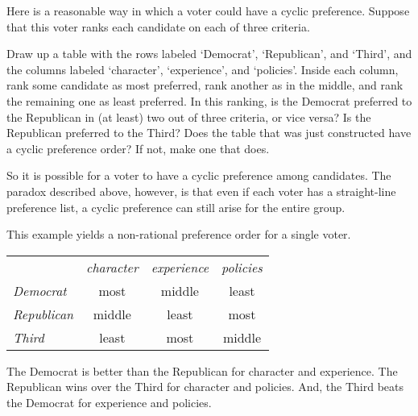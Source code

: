 \begin{exercises}
  \item \label{IrrIndVote}
    Here is a reasonable way in which a voter could have a cyclic preference.
    Suppose that this voter ranks each candidate
    on each of three criteria.
    \begin{exparts}
      \partsitem Draw up a table with the rows labeled `Democrat',
         `Republican', and `Third', and the columns labeled
         `character', `experience', and `policies'.
         Inside each column, rank some 
         candidate as most preferred, 
         rank another as in the middle, and rank the remaining one
         as least preferred.
      \partsitem In this ranking, is the Democrat preferred to the Republican
         in (at least) two out of three criteria, or vice versa?
         Is the Republican preferred to the Third?
      \partsitem  Does the table that was 
         just constructed have a cyclic preference order?
         If not, make one that does.
    \end{exparts}
    So it is possible for a voter to have a cyclic preference among candidates.
    The paradox described above, however, is that even if each voter has a
    straight-line preference list, 
    a cyclic preference can still arise for the entire group. 
    \begin{answer}
      This example yields a non-rational preference order for a 
      single voter.
      \smallskip
      \begin{center}
        \begin{tabular}{l|c|c|c|}
             \multicolumn{1}{c}{\ }
                  &\multicolumn{1}{c}{\textit{character}}
                  &\multicolumn{1}{c}{\textit{experience}}
                  &\multicolumn{1}{c}{\textit{policies}}   \\ 
          \cline{2-4}
         \textit{Democrat}   &most    &middle  &least   \\
         \textit{Republican} &middle  &least   &most    \\
         \textit{Third}      &least   &most    &middle  \\
          \cline{2-4}
        \end{tabular}
      \end{center}
      \smallskip
      The Democrat is better than the Republican for character and
      experience.
      The Republican wins over the Third for character and policies.
      And, the Third beats the Democrat for experience and policies.
    \end{answer}

\end{exercises}
